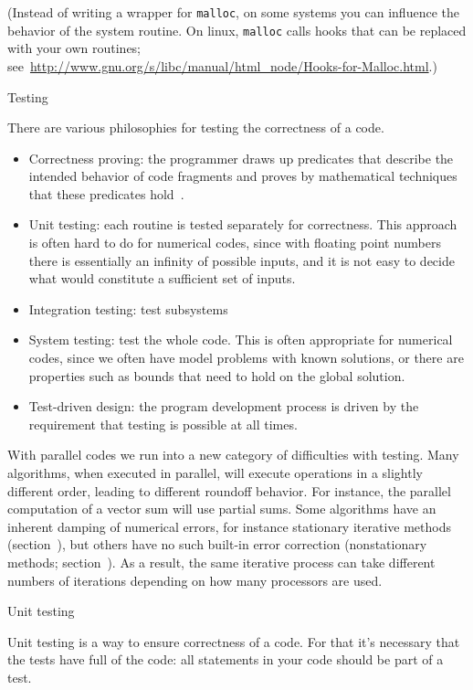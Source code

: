 (Instead of writing a wrapper for \lstinline{malloc}, on some systems you can
influence the behavior of the system routine. On linux, \lstinline{malloc}
calls hooks that can be replaced with your own routines;
see~\url{http://www.gnu.org/s/libc/manual/html_node/Hooks-for-Malloc.html}.)

 {Testing}

There are various philosophies for testing the correctness of a code.
\begin{itemize}
\item Correctness proving: the programmer draws up predicates that
  describe the intended behavior of code fragments and proves by
  mathematical techniques that these predicates
  hold~\cite{Hoare1969axiomatic,Dijkstra1974Programming}.
\item Unit testing: each routine is tested separately for
  correctness. This approach is often hard to do for numerical codes,
  since with floating point numbers there is essentially an infinity
  of possible inputs, and it is not easy to decide what would
  constitute a sufficient
  set of inputs.
\item Integration testing: test subsystems
\item System testing: test the whole code. This is often appropriate
  for numerical codes, since we often have model problems with known
  solutions, or there are properties such as bounds that need to hold
  on the global solution.
\item Test-driven design: the program development process is driven by
  the requirement that testing is possible at all times.
\end{itemize}

With parallel codes we run into a new category of difficulties with
testing. Many algorithms, when executed in parallel, will execute
operations in a slightly different order, leading to different
roundoff behavior. For instance, the parallel computation of a vector
sum will use partial sums. Some algorithms have an inherent damping of
numerical errors, for instance stationary iterative methods
(section~), but others have no such built-in error
correction (nonstationary methods;
section~). As a result, the same iterative
process can take different numbers of iterations depending on how many
processors are used.
 
 {Unit testing}

Unit testing is a way to ensure correctness of a code.
For that it's necessary that the tests have full 
of the code: all statements in your code should be part of a test.

